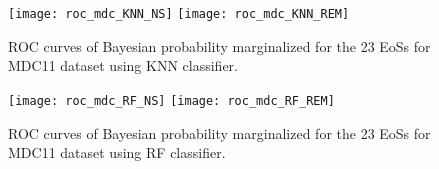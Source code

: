 
\begin{figure}%
\texttt{[image: roc\_mdc\_KNN\_NS]}
\texttt{[image: roc\_mdc\_KNN\_REM]}
\caption{ROC curves of Bayesian probability marginalized
    for the 23 EoSs for MDC11 dataset using \ac{KNN} classifier.}
\label{fig:rocMDC_KNN}
\end{figure}

\begin{figure}%
\texttt{[image: roc\_mdc\_RF\_NS]}
\texttt{[image: roc\_mdc\_RF\_REM]}
\caption{ROC curves of Bayesian probability marginalized for the 23 EoSs for MDC11 dataset using \ac{RF} classifier.}
\label{fig:rocMDC_RF}
\end{figure}

